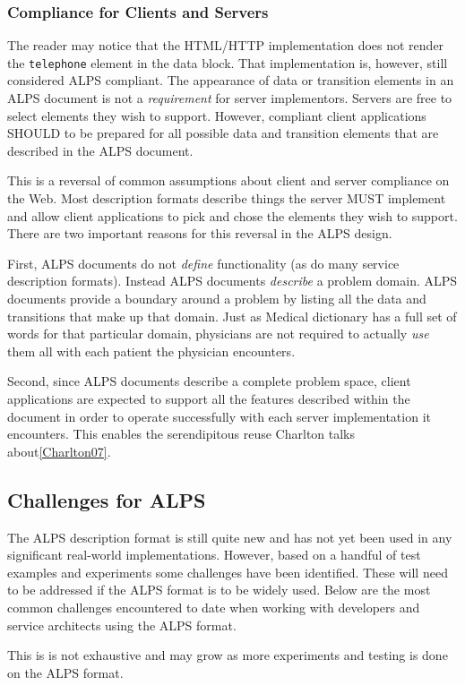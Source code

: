 \documentclass{wsrest2014}
\begin{document}
\subsubsection{Compliance for Clients and Servers}
\label{_compliance_for_clients_and_servers}
 \par{}The reader may notice that the HTML/HTTP implementation does not render the \texttt{telephone} element in the data block. That implementation is, however, still considered ALPS compliant. The appearance of data or transition elements in an ALPS document is not a \emph{requirement} for server implementors. Servers are free to select elements they wish to support. However, compliant client applications SHOULD to be prepared for all possible data and transition elements that are described in the ALPS document.
 \par{}This is a reversal of common assumptions about client and server compliance on the Web. Most description formats describe things the server MUST implement and allow client applications to pick and chose the elements they wish to support. There are two important reasons for this reversal in the ALPS design.
 \par{}First, ALPS documents do not \emph{define} functionality (as do many service description formats). Instead ALPS documents \emph{describe} a problem domain. ALPS documents provide a boundary around a problem by listing all the data and transitions that make up that domain. Just as Medical dictionary has a full set of words for that particular domain, physicians are not required to actually \emph{use} them all with each patient the physician encounters.
 \par{}Second, since ALPS documents describe a complete problem space, client applications are expected to support all the features described within the document in order to operate successfully with each server implementation it encounters. This enables the \textquotedbl{}serendipitous reuse\textquotedbl{} Charlton talks about\hyperlink{Charlton07}{[Charlton07]}.
\hypertarget{_challenges_for_alps}{}
\subsection{Challenges for ALPS}
\label{_challenges_for_alps}
 \par{}The ALPS description format is still quite new and has not yet been used in any significant real-world implementations. However, based on a handful of test examples and experiments some challenges have been identified. These will need to be addressed if the ALPS format is to be widely used. Below are the most common challenges encountered to date when working with developers and service architects using the ALPS format.
 \par{}This is is not exhaustive and may grow as more experiments and testing is done on the ALPS format.
\hypertarget{_no_urls}{}
\end{document}
